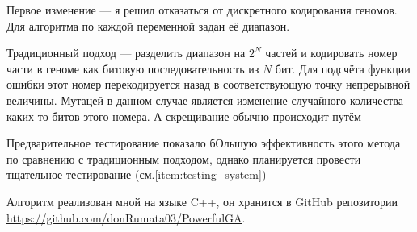 \documentclass[11pt]{article}
\begin{document}
    Первое изменение — я решил отказаться от дискретного кодирования геномов.
    Для алгоритма по каждой переменной задан её диапазон.

    Традиционный подход — разделить диапазон на $2^N$ частей и кодировать номер части в геноме как битовую последовательность из $N$ бит.
    Для подсчёта функции ошибки этот номер перекодируется назад в соответствующую точку непрерывной величины.
    Мутацей в данном случае является изменение случайного количества каких-то битов этого номера.
    А скрещивание обычно происходит путём

    Предварительное тестирование показало бОльшую эффективность этого метода по сравнению с традиционным подходом, однако планируется провести тщательное тестирование (см.\ \ref{item:testing_system})

    Алгоритм реализован мной на языке C++, он хранится в GitHub репозитории \href{https://github.com/donRumata03/PowerfulGA}{https://github.com/donRumata03/PowerfulGA}.
\end{document}
